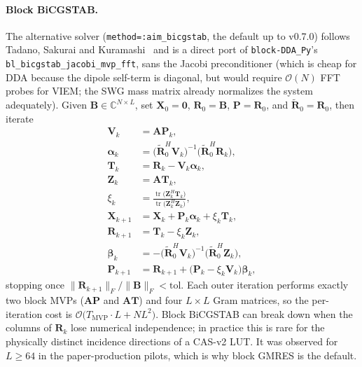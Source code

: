 \documentclass[11pt,a4paper]{article}
\begin{document}
\paragraph{Block BiCGSTAB.}
The alternative solver (\texttt{method=:aim\_bicgstab}, the default up
to v0.7.0) follows Tadano, Sakurai and Kuramashi~\cite{TSK2009}
and is a direct port of \texttt{block-DDA\_Py}'s
\texttt{bl\_bicgstab\_\allowbreak jacobi\_\allowbreak mvp\_fft},
sans the Jacobi preconditioner
(which is cheap for DDA because the dipole self-term is diagonal, but
would require $\mathcal{O}(N)$ FFT probes for VIEM; the SWG mass matrix
already normalizes the system adequately). Given $\mathbf{B}\in
\mathbb{C}^{N\times L}$, set $\mathbf{X}_0=\mathbf{0}$,
$\mathbf{R}_0=\mathbf{B}$, $\mathbf{P}=\mathbf{R}_0$, and
$\widetilde{\mathbf{R}}_0=\mathbf{R}_0$, then iterate
\begin{align}
  \mathbf{V}_k    &= \mathbf{A}\mathbf{P}_k, \\
  \boldsymbol{\alpha}_k
    &= \bigl(\widetilde{\mathbf{R}}_0^{\!H}\mathbf{V}_k\bigr)^{-1}
       \bigl(\widetilde{\mathbf{R}}_0^{\!H}\mathbf{R}_k\bigr), \\
  \mathbf{T}_k    &= \mathbf{R}_k - \mathbf{V}_k\boldsymbol{\alpha}_k, \\
  \mathbf{Z}_k    &= \mathbf{A}\mathbf{T}_k, \\
  \xi_k &=
  \frac{\operatorname{tr}\bigl(\mathbf{Z}_k^{\!H}\mathbf{T}_k\bigr)}
       {\operatorname{tr}\bigl(\mathbf{Z}_k^{\!H}\mathbf{Z}_k\bigr)}, \\
  \mathbf{X}_{k+1} &= \mathbf{X}_k + \mathbf{P}_k\boldsymbol{\alpha}_k + \xi_k \mathbf{T}_k, \\
  \mathbf{R}_{k+1} &= \mathbf{T}_k - \xi_k \mathbf{Z}_k, \\
  \boldsymbol{\beta}_k
    &= -\bigl(\widetilde{\mathbf{R}}_0^{\!H}\mathbf{V}_k\bigr)^{-1}
       \bigl(\widetilde{\mathbf{R}}_0^{\!H}\mathbf{Z}_k\bigr), \\
  \mathbf{P}_{k+1} &=
    \mathbf{R}_{k+1} + \bigl(\mathbf{P}_k - \xi_k \mathbf{V}_k\bigr)\boldsymbol{\beta}_k,
\end{align}
stopping once
$\|\mathbf{R}_{k+1}\|_F / \|\mathbf{B}\|_F < \mathrm{tol}$.
Each outer iteration performs exactly two block MVPs
($\mathbf{A}\mathbf{P}$ and $\mathbf{A}\mathbf{T}$) and four $L\times L$
Gram matrices, so the per-iteration cost is
$\mathcal{O}\!\bigl(T_{\text{MVP}} \cdot L + NL^2\bigr)$. Block BiCGSTAB
can break down when the columns of $\mathbf{R}_k$ lose numerical
independence; in practice this is rare for the physically distinct
incidence directions of a CAS-v2 LUT. It was observed for $L \ge 64$ in
the paper-production pilots, which is why block GMRES is the default.
\end{document}
